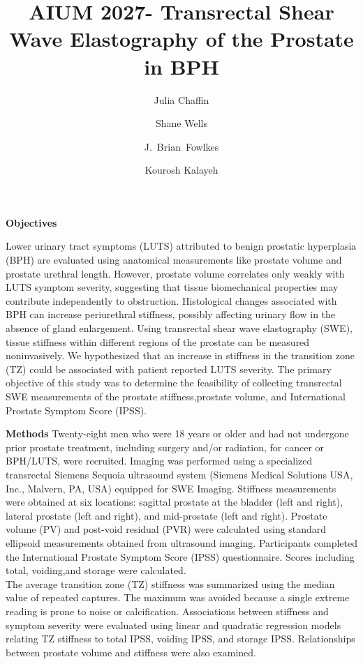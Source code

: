 \documentclass[11 pt,letterpaper]{article}
\title{
\vspace{-1.9em}
\bfseries\fontsize{15pt}{17pt}\selectfont
AIUM 2027- Transrectal Shear Wave Elastography of the Prostate in BPH
\vspace{-0.78em}
}
\author[a,b]{Julia Chaffin}
\author[b,a]{Shane Wells}
\author[a,b]{J.~Brian~Fowlkes}
\author[a,b,c]{Kourosh Kalayeh}
\affil[a]{Department of Biomedical Engineering, University of Michigan, Ann Arbor, Michigan, USA}
\affil[b]{Department of Radiology, University of Michigan, Ann Arbor, Michigan, USA}
\affil[c]{Department of Urology, University of Michigan, Ann Arbor, Michigan, USA}
\date{}
\begin{document}
\maketitle
\vspace{-3.9em}

\noindent
\textbf{Objectives}

Lower urinary tract symptoms (LUTS) attributed to benign prostatic hyperplasia (BPH) are evaluated using anatomical measurements like prostate volume and prostate urethral length.
However, prostate volume correlates only weakly with LUTS symptom severity, suggesting that tissue biomechanical properties may contribute independently to obstruction. Histological changes associated with BPH can increase periurethral stiffness, possibly affecting urinary flow in the absence of gland enlargement.
Using transrectal shear wave elastography (SWE), tissue stiffness within different regions of the prostate can be measured noninvasively.
We hypothesized that an increase in stiffness in the transition zone (TZ) could be associated with patient reported LUTS severity.
The primary objective of this study was to determine the feasibility of collecting transrectal SWE measurements of the prostate stiffness,prostate volume, and International Prostate Symptom Score (IPSS). 



\noindent
\textbf{Methods}
Twenty-eight men who were 18 years or older and had not undergone prior prostate treatment, including surgery and/or radiation, for cancer or BPH/LUTS, were recruited.
Imaging was performed using a specialized transrectal Siemens Sequoia ultrasound system (Siemens Medical Solutions USA, Inc., Malvern, PA, USA) equipped for SWE Imaging.
Stiffness measurements were obtained at six locations: sagittal prostate at the bladder (left and right), lateral prostate (left and right), and mid-prostate (left and right).
Prostate volume (PV) and post-void residual (PVR) were calculated using standard ellipsoid measurements obtained from ultrasound imaging.
Participants completed the International Prostate Symptom Score (IPSS) questionnaire.
Scores including total, voiding,and storage were calculated.
\\

The average transition zone (TZ) stiffness was summarized using the median value of repeated captures. The maximum was avoided because a single extreme reading is prone to noise or calcification.
Associations between stiffness and symptom severity were evaluated using linear and quadratic regression models relating TZ stiffness to total IPSS, voiding IPSS, and storage IPSS.
Relationships between prostate volume and stiffness were also examined. 
\end{document}
